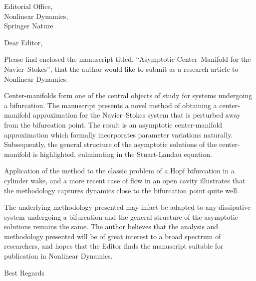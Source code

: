 \documentclass[]{letter}
\begin{document}

\begin{letter}{Editorial Office,\\Nonlinear Dynamics,\\Springer Nature}

\address{Okinawa Institute of Science and Technology,\\ Graduate University, \\Onna, Okinawa 904-0495, Japan}

\opening{Dear Editor,}

Please find enclosed the manuscript titled, “Asymptotic Center--Manifold for the Navier–Stokes”, that the author would like to submit as a research article to Nonlinear Dynamics.

Center-manifolds form one of the central objects of study for systems undergoing a bifurcation. 
The manuscript presents a novel method of obtaining a center-manifold approximation for the Navier--Stokes system that is perturbed away from the bifurcation point. The result is an asymptotic center-manifold approximation which formally incorporates parameter variations naturally. Subsequently, the general structure of the asymptotic solutions of the center-manifold is highlighted, culminating in the Stuart-Landau equation.

Application of the method to the classic problem of a Hopf bifurcation in a cylinder wake, and a more recent case of flow in an open cavity illustrates that the methodology captures dynamics close to the bifurcation point quite well. 

The underlying methodology presented may infact be adapted to any dissipative system undergoing a bifurcation and the general structure of the asymptotic solutions remains the same. The author believes that the analysis and methodology presented will be of great interest to a broad spectrum of researchers, and hopes that the Editor finds the manuscript suitable for publication in Nonlinear Dynamics.


\signature{Prabal S. Negi}

\closing{Best Regards}


\end{letter}
\end{document}
